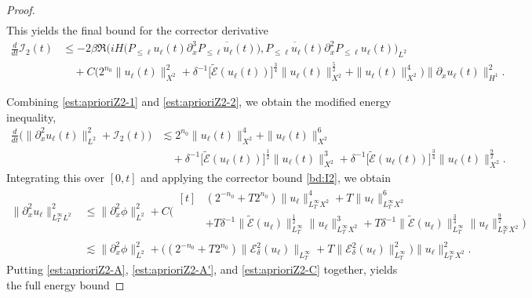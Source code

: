 \documentclass[10pt,a4paper]{amsart}
\begin{document}
\begin{proof}
$$\begin{aligned}
\end{aligned}$$
This yields the final bound for the corrector derivative
\begin{equation}\label{est:aprioriZ2-2}
\begin{aligned}
\frac{d}{dt}\mathcal{I}_2(t)&\leq - 2\beta \Re \big( iH\big(P_{\leq \ell}u_\ell(t)\partial_x^3\overline{P_{\leq \ell}u_\ell(t)}\big) ,\overline{P_{\leq \ell}u_\ell(t)}\partial_x^2P_{\leq \ell}u_\ell(t)\big)_{L^2} \\
&\quad +C\Big( 2^{n_0}\| u_\ell(t) \|_{X^2}^2+ \delta^{-1}\big[ \widetilde{\mathcal{E}}(u_\ell(t))\big] ^{\frac34}\| u_\ell(t) \|_{X^2}^{\frac52}+\| u_\ell(t) \|_{X^2}^4\Big) \| \partial_xu_\ell(t) \|_{H^1}^2.
\end{aligned}
\end{equation}

Combining \eqref{est:aprioriZ2-1} and \eqref{est:aprioriZ2-2}, we obtain the modified energy inequality,
$$\begin{aligned}
\frac{d}{dt}\big( \| \partial_x^2u_\ell(t) \|_{L^2}^2+\mathcal{I}_2(t)\big) &\lesssim 2^{n_0}\| u_\ell(t) \|_{X^2}^4+\| u_\ell(t) \|_{X^2}^6 \\
&\quad +\delta^{-1}\big[ \widetilde{\mathcal{E}}(u_\ell(t))\big] ^{\frac12}\| u_\ell(t) \|_{X^2}^3+\delta^{-1}\big[ \widetilde{\mathcal{E}}(u_\ell(t))\big] ^{\frac34}\| u_\ell(t) \|_{X^2}^{\frac92}.
\end{aligned}$$
Integrating this over $[0, t]$ and applying the corrector bound \eqref{bd:I2}, we obtain
\begin{equation}\label{est:aprioriZ2-C}
\begin{aligned}
\| \partial_x^2u_\ell \|_{L^\infty_TL^2}^2
&\leq \| \partial_x^2\phi \|_{L^2}^2+C
\Big( \begin{aligned}[t]
&(2^{-n_0}+T2^{n_0})\| u_\ell \|_{L^\infty_TX^2}^4+T\| u_\ell \|_{L^\infty_TX^2}^6 \\
&+T\delta^{-1}\| \widetilde{\mathcal{E}}(u_\ell) \|_{L^\infty_T}^{\frac12}\| u_\ell \|_{L^\infty_TX^2}^3+T\delta^{-1}\| \widetilde{\mathcal{E}}(u_\ell) \|_{L^\infty_T}^{\frac34}\| u_\ell \|_{L^\infty_TX^2}^{\frac92}\Big)
\end{aligned} \\
&\lesssim \| \partial_x^2\phi \|_{L^2}^2+\Big( (2^{-n_0}+T2^{n_0})\| \mathcal{E}^2_\delta(u_\ell) \|_{L^\infty_T}+T\| \mathcal{E}^2_\delta(u_\ell) \|_{L^\infty_T}^2\Big) \| u_\ell \|_{L^\infty_TX^2}^2.
\end{aligned}
\end{equation}
Putting \eqref{est:aprioriZ2-A}, \eqref{est:aprioriZ2-A'}, and \eqref{est:aprioriZ2-C} together,  yields the full energy  bound

\end{proof}
\end{document}
